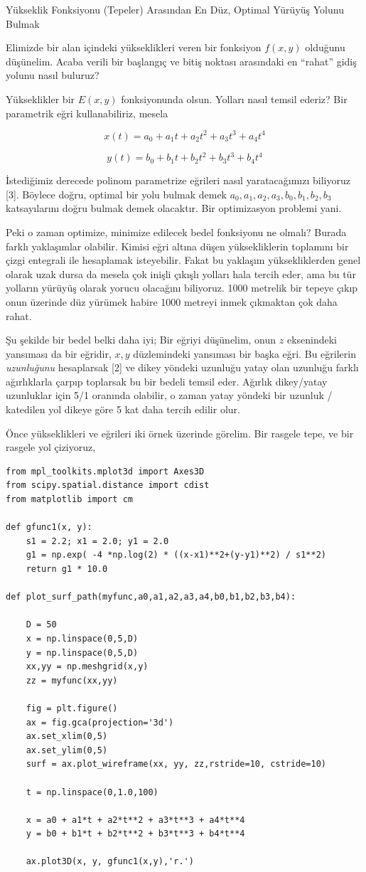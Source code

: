 \documentclass[12pt,fleqn]{article}\usepackage{../../common}
\begin{document}
Yükseklik Fonksiyonu (Tepeler) Arasından En Düz, Optimal Yürüyüş Yolunu Bulmak

Elimizde bir alan içindeki yükseklikleri veren bir fonksiyon $f(x,y)$
olduğunu düşünelim. Acaba verili bir başlangıç ve bitiş noktası arasındaki
en ``rahat'' gidiş yolunu nasıl buluruz? 

Yükseklikler bir $E(x,y)$ fonksiyonunda olsun. Yolları nasıl temsil ederiz?
Bir parametrik eğri kullanabiliriz, mesela 

$$
x(t) = a_0 + a_1 t + a_2 t^2 + a_3 t^3 + a_4 t^4
$$

$$
y(t) = b_0 + b_1 t + b_2 t^2 + b_3 t^3 + b_4 t^4
$$

İstediğimiz derecede polinom parametrize eğrileri nasıl yaratacağımızı
biliyoruz [3]. Böylece doğru, optimal bir yolu bulmak demek
$a_0,a_1,a_2,a_3,b_0,b_1,b_2,b_3$ katsayılarını doğru bulmak demek
olacaktır. Bir optimizasyon problemi yani.

Peki o zaman optimize, minimize edilecek bedel fonksiyonu ne olmalı? Burada
farklı yaklaşımlar olabilir. Kimisi eğri altına düşen yüksekliklerin
toplamını bir çizgi entegrali ile hesaplamak isteyebilir. Fakat bu yaklaşım
yüksekliklerden genel olarak uzak dursa da mesela çok inişli çıkışlı
yolları hala tercih eder, ama bu tür yolların yürüyüş olarak yorucu
olacağını biliyoruz. 1000 metrelik bir tepeye çıkıp onun üzerinde düz
yürümek habire 1000 metreyi inmek çıkmaktan çok daha rahat.

Şu şekilde bir bedel belki daha iyi; Bir eğriyi düşünelim, onun $z$
eksenindeki yansıması da bir eğridir, $x,y$ düzlemindeki yansıması bir
başka eğri. Bu eğrilerin {\em uzunluğunu} hesaplarsak [2] ve dikey yöndeki
uzunluğu yatay olan uzunluğu farklı ağırlıklarla çarpıp toplarsak bu bir
bedeli temsil eder. Ağırlık dikey/yatay uzunluklar için 5/1 oranında
olabilir, o zaman yatay yöndeki bir uzunluk / katedilen yol dikeye göre 5
kat daha tercih edilir olur.

Önce yükseklikleri ve eğrileri iki örnek üzerinde görelim. Bir rasgele
tepe, ve bir rasgele yol çiziyoruz,

\begin{verbatim}
from mpl_toolkits.mplot3d import Axes3D
from scipy.spatial.distance import cdist
from matplotlib import cm

def gfunc1(x, y):
    s1 = 2.2; x1 = 2.0; y1 = 2.0
    g1 = np.exp( -4 *np.log(2) * ((x-x1)**2+(y-y1)**2) / s1**2)
    return g1 * 10.0

def plot_surf_path(myfunc,a0,a1,a2,a3,a4,b0,b1,b2,b3,b4):

    D = 50
    x = np.linspace(0,5,D)
    y = np.linspace(0,5,D)
    xx,yy = np.meshgrid(x,y)
    zz = myfunc(xx,yy)

    fig = plt.figure()
    ax = fig.gca(projection='3d')
    ax.set_xlim(0,5)
    ax.set_ylim(0,5)
    surf = ax.plot_wireframe(xx, yy, zz,rstride=10, cstride=10)

    t = np.linspace(0,1.0,100)

    x = a0 + a1*t + a2*t**2 + a3*t**3 + a4*t**4 
    y = b0 + b1*t + b2*t**2 + b3*t**3 + b4*t**4

    ax.plot3D(x, y, gfunc1(x,y),'r.')
\end{verbatim}
\end{document}
